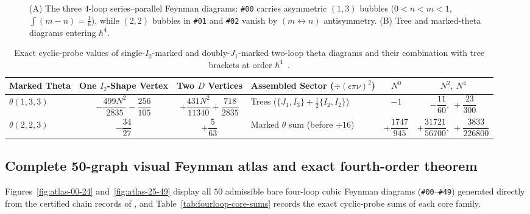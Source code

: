 \documentclass[11pt,letterpaper]{article}
\numberwithin{equation}{section}
\theoremstyle{plain}
\theoremstyle{definition}
\theoremstyle{remark}
\begin{document}
\begin{figure}[H]
\caption{(A) The three $4$-loop series--parallel Feynman diagrams: \texttt{\#00} carries asymmetric $(1,3)$ bubbles ($0<n<m<1$, $\int(m-n)=\frac{1}{6}$), while $(2,2)$ bubbles in \texttt{\#01} and \texttt{\#02} vanish by $(m\leftrightarrow n)$ antisymmetry. (B) Tree and marked-theta diagrams entering $\hbar^4$.}
\label{fig:fourloop-sp-and-marked}
\end{figure}

\begin{table}[H]
\centering
\scriptsize
\setlength{\tabcolsep}{3.8pt}
\renewcommand{\arraystretch}{1.35}
\begin{tabular}{@{}lcc|lcc@{}}
\toprule
\textbf{Marked Theta} & \textbf{One $I_2$-Shape Vertex} & \textbf{Two $D$ Vertices} & \textbf{Assembled Sector ($\div(\epsilon\pi\nu)^2$)} & $N^0$ & $N^2,\ N^4$ \\
\midrule
$\theta(1,3,3)$ & $-\dfrac{499N^2}{2835} - \dfrac{256}{105}$ & $+\dfrac{431N^2}{11340} + \dfrac{718}{2835}$ & Trees ($\{J_1,I_3\} + \frac{1}{2}\{I_2,I_2\}$) & $-1$ & $-\dfrac{11}{60},\ +\dfrac{23}{300}$ \\[4.5pt]
$\theta(2,2,3)$ & $-\dfrac{34}{27}$ & $+\dfrac{5}{63}$ & Marked $\theta$ sum (before $\div 16$) & $+\dfrac{1747}{945}$ & $+\dfrac{31721}{56700},\ +\dfrac{3833}{226800}$ \\
\bottomrule
\end{tabular}
\caption{Exact cyclic-probe values of single-$I_2$-marked and doubly-$J_1$-marked two-loop theta diagrams and their combination with tree brackets at order $\hbar^4$~\cite[\S6.1]{RepoAllOrders}.}
\label{tab:marked-theta-h4}
\end{table}

\subsection{Complete 50-graph visual Feynman atlas and exact fourth-order theorem}
\label{subsec:fourloop-50}

Figures~\ref{fig:atlas-00-24} and~\ref{fig:atlas-25-49} display all $50$ admissible bare four-loop cubic Feynman diagrams (\texttt{\#00}--\texttt{\#49}) generated directly from the certified chain records of , and Table~\ref{tab:fourloop-core-sums} records the exact cyclic-probe sums of each core family.
\end{document}
